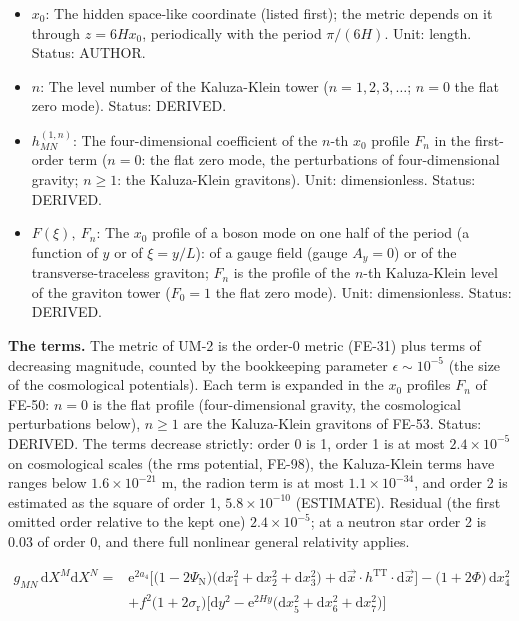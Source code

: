 \documentclass[
  10pt,
]{article}
\begin{document}
\begin{itemize}
\item
  \(x_0\): The hidden space-like coordinate (listed first); the metric
  depends on it through \(z = 6Hx_0\), periodically with the period
  \(\pi/(6H)\). Unit: length. Status: AUTHOR.
\item
  \(n\): The level number of the Kaluza-Klein tower
  (\(n = 1, 2, 3, \dots\); \(n = 0\) the flat zero mode). Status:
  DERIVED.
\item
  \(h^{(1,n)}_{MN}\): The four-dimensional coefficient of the \(n\)-th
  \(x_0\) profile \(F_n\) in the first-order term (\(n = 0\): the flat
  zero mode, the perturbations of four-dimensional gravity; \(n \ge 1\):
  the Kaluza-Klein gravitons). Unit: dimensionless. Status: DERIVED.
\item
  \(F(\xi),\ F_n\): The \(x_0\) profile of a boson mode on one half of
  the period (a function of \(y\) or of \(\xi = y/L\)): of a gauge field
  (gauge \(A_y = 0\)) or of the transverse-traceless graviton; \(F_n\)
  is the profile of the \(n\)-th Kaluza-Klein level of the graviton
  tower (\(F_0 = 1\) the flat zero mode). Unit: dimensionless. Status:
  DERIVED.
\end{itemize}

\textbf{The terms.} The metric of UM-2 is the order-0 metric (FE-31)
plus terms of decreasing magnitude, counted by the bookkeeping parameter
\(\epsilon \sim 10^{-5}\) (the size of the cosmological potentials).
Each term is expanded in the \(x_0\) profiles \(F_n\) of FE-50:
\(n = 0\) is the flat profile (four-dimensional gravity, the
cosmological perturbations below), \(n \ge 1\) are the Kaluza-Klein
gravitons of FE-53. Status: DERIVED. The terms decrease strictly: order
0 is 1, order 1 is at most \(2.4\times10^{-5}\) on cosmological scales
(the rms potential, FE-98), the Kaluza-Klein terms have ranges below
\(1.6\times10^{-21}\) m, the radion term is at most
\(1.1\times10^{-34}\), and order 2 is estimated as the square of order
1, \(5.8\times10^{-10}\) (ESTIMATE). Residual (the first omitted order
relative to the kept one) \(2.4\times10^{-5}\); at a neutron star order
2 is 0.03 of order 0, and there full nonlinear general relativity
applies.

\[
\begin{aligned}
g_{MN}\,\mathrm{d}X^M\mathrm{d}X^N ={}& \mathrm{e}^{2a_4}\Big[\big(1 -
 2\Psi_{\mathrm{N}}\big)\big(\mathrm{d}x_1^2 + \mathrm{d}x_2^2
 + \mathrm{d}x_3^2\big) + \mathrm{d}\vec x\cdot h^{\mathrm{TT}}\cdot\mathrm{d}\vec x\Big] - \big(1 +
 2\Phi\big)\,\mathrm{d}x_4^2\\
 &+ f^2\big(1 + 2\sigma_{\mathrm{r}}\big)\Big[\mathrm{d}y^2 - \mathrm{e}^{2Hy}\big(\mathrm{d}x_5^2 +
 \mathrm{d}x_6^2 + \mathrm{d}x_7^2\big)\Big]
\end{aligned} \tag{FE-88}
\]
\end{document}
